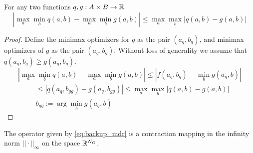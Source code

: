 %
\begin{lemma}\label{lem:maxmin} For any two functions $q, g: A \times B \rightarrow \mathbb{R}$
\begin{equation}
|\max_a \min_b q(a,b) -\max_a \min_b g(a,b)| \leq \max_a \max_b |q(a,b) - g(a,b)|
\end{equation}
\end{lemma}
%
\begin{proof}
Define the minimax optimizers for $q$ as the pair $(a_q,b_q)$, and minimax optimizers of $g$ as the pair $(a_g, b_g)$. Without loss of generality we assume that $q(a_q,b_q) \geq g(a_g,b_g)$.
%
\begin{equation*}
|\max_a \min_b q(a,b) -\max_a \min_b g(a,b)|
\leq |f(a_q,b_q) - \min_b g(a_q,b)|
\end{equation*}
%
\begin{equation*}
\begin{split}
&\leq |q(a_q,b_{gg}) - g(a_q,b_{gg})| \leq \max_a \max_b |q(a,b) - g(a,b)|\\
&b_{gg} :=\arg\min_b g(a_q,b)
\end{split}
\end{equation*}
%
\end{proof}
%
\begin{proposition} 
The operator given by \eqref{eq:backup_mdr} is a contraction mapping in the infinity norm $|| \cdot ||_{\infty}$ on the space $\mathbb{R}^{N_G}$.
\end{proposition}
